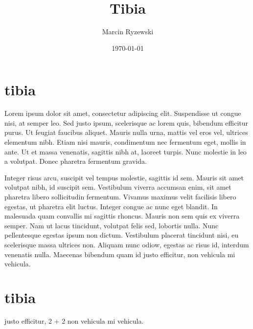\documentclass{article}
\begin{document}
\title{Tibia}
\author{Marcin Ryzewski}
\date{\today}
\maketitle  

\section{tibia}

Lorem ipsum dolor sit amet, consectetur adipiscing elit. 
Suspendisse ut congue nisi, at semper leo. Sed justo ipsum, 
scelerisque ac lorem quis, bibendum efficitur purus. 
Ut feugiat faucibus aliquet. Mauris nulla urna, mattis vel 
eros vel, ultrices elementum nibh. Etiam nisi mauris, 
condimentum nec fermentum eget, mollis in ante. Ut et 
massa venenatis, sagittis nibh at, laoreet turpis. Nunc molestie 
in leo a volutpat. Donec pharetra fermentum gravida.

Integer risus arcu, suscipit vel tempus molestie, 
sagittis id sem. Mauris sit amet volutpat nibh, id suscipit sem. 
Vestibulum viverra accumsan enim, sit amet pharetra libero 
sollicitudin fermentum. Vivamus maximus velit facilisis libero 
egestas, ut pharetra elit luctus. Integer congue ac nunc eget 
blandit. In malesuada quam convallis mi sagittis rhoncus. Mauris non 
sem quis ex viverra semper. Nam ut lacus tincidunt, volutpat felis sed, 
lobortis nulla. Nunc pellentesque egestas ipsum non dictum. Vestibulum 
placerat tincidunt nisi, eu scelerisque massa ultrices non. Aliquam nunc odiow,
egestas ac risus id, interdum venenatis nulla. Maecenas bibendum quam id 
justo efficitur, non vehicula mi vehicula.

\section{tibia}
justo efficitur, 2 + 2 non vehicula mi vehicula.
\end{document}
